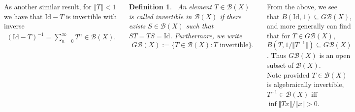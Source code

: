 \documentclass{tikzposter} %
\newtheorem{lemma}[theorem]{Lemma}
\newtheorem{definition}{Definition}
\begin{document}
\begin{columns}
{    As another similar result, for $\Vert T \Vert < 1$ we have that $\mathrm{Id} - T$ is invertible with inverse
    \begin{align*}
      (\mathrm{Id}-T)^{-1} = \sum_{n=0}^{\infty} T^{n} \in \mathcal{B}(X).
    \end{align*}

    \begin{definition}
      \ An element $T \in \mathcal{B}(X)$ is called invertible in $\mathcal{B}(X)$ if there exists $S \in \mathcal{B}(X)$ such that $ST = TS = \mathrm{Id}$. Furthermore, we write
      \begin{align*}
        G\mathcal{B}(X) := \{T \in \mathcal{B}(X) : T \, \, \mathrm{invertible}\}.
      \end{align*}
    \end{definition}
    \hphantom{}

    From the above, we see that $B(\mathrm{Id}, 1) \subseteq G\mathcal{B}(X)$, and more generally can find that for $T \in G\mathcal{B}(X)$, $B(T,1/\Vert T^{-1} \Vert) \subseteq G\mathcal{B}(X)$. Thus $G\mathcal{B}(X)$ is an open subset of $\mathcal{B}(X)$. \\

    Note provided $T \in \mathcal{B}(X)$ is algebraically invertible, $T^{-1} \in \mathcal{B}(X)$ iff $\inf \Vert Tx \Vert / \Vert x \Vert > 0$.
  }
\end{columns}
\end{document}
